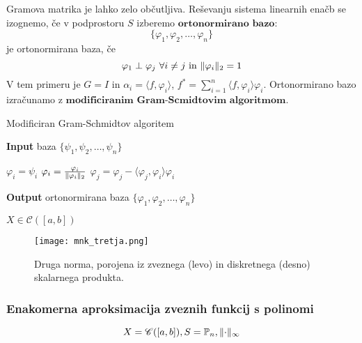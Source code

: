 \documentclass[a4paper,12pt]{article}
\DeclarePairedDelimiter\norm{\lVert}{\rVert}
\newcommand{\innerproduct}[2]{\langle #1, #2 \rangle}
\theoremstyle{definition}
\theoremstyle{remark}
\newcommand{\Pp}{\mathbb{P}}
\begin{document}

Gramova matrika je lahko zelo občutljiva. Reševanju sistema linearnih enačb se izognemo, če v podprostoru $S$ izberemo $\textbf{ortonormirano bazo}$:
\begin{equation*}
    \{\varphi_1, \varphi_2, \dots, \varphi_n\}
\end{equation*}
je ortonormirana baza, če
\begin{equation*}
    \varphi_1 \perp \varphi_j \text{ } \forall i \neq j \text{ in } \norm{\varphi_i}_2 = 1
\end{equation*}
V tem primeru je $G = I$ in $\alpha_i = \innerproduct{f}{\varphi_i}$,  $f^* = \sum_{i = 1}^{n}\innerproduct{f}{\varphi_i} \varphi_i$. Ortonormirano
bazo izračunamo z $\textbf{modificiranim Gram-Scmidtovim algoritmom}$.

\begin{algorithm}
    \caption{Modificiran Gram-Schmidtov algoritem}\label{alg:mgs}
    \hspace*{\algorithmicindent} \textbf{Input} baza $\{\psi_1, \psi_2, \dots, \psi_n\}$
    \begin{algorithmic}[1]
            \State $\varphi_i = \psi_i$
        \EndFor
            \State $\varphi_i = \frac{\varphi_i}{\norm{\varphi_i}_2}$
                \State $\varphi_j = \varphi_j - \innerproduct{\varphi_j}{\varphi_i}\varphi_i$
            \EndFor
        \EndFor
    \end{algorithmic}
    \hspace*{\algorithmicindent} \textbf{Output} ortonormirana baza $\{\varphi_1, \varphi_2, \dots, \varphi_n\}$
\end{algorithm}


$X \in \mathscr{C}([a, b])$
\begin{figure}[H]
    \center
    \texttt{[image: mnk\_tretja.png]}
    \caption{Druga norma, porojena iz zveznega (levo) in diskretnega (desno) skalarnega produkta.}
\end{figure}

\subsubsection{Enakomerna aproksimacija zveznih funkcij s polinomi}
\begin{equation*}
    X = \mathscr{C} ([a, b]), S = \Pp_n, \norm{\cdot}_{\infty}
\end{equation*}
\end{document}
